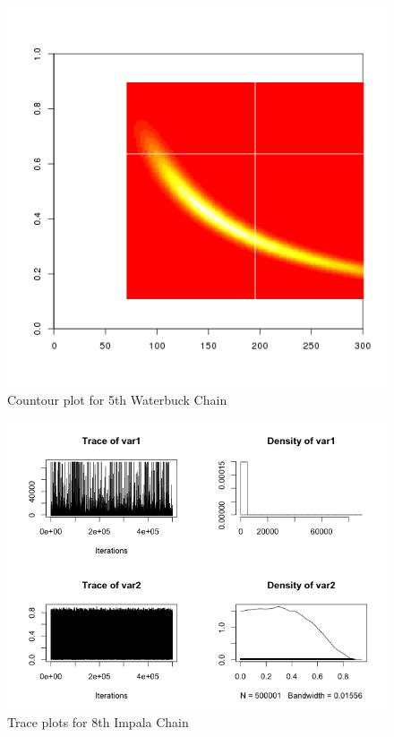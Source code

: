 \documentclass[paper=a4, fontsize=11pt]{scrartcl}
\begin{document}
\begin{figure}[h!]
  \caption{Countour plot for 5th Waterbuck Chain}
  \centering
	\includegraphics[scale=.8]{keskici_wxiao_ps4_task_waterbuck_run5_plot5.png}
\end{figure}

\begin{figure}[h!]
  \caption{Trace plots for 8th Impala Chain}
  \centering
	\includegraphics[scale=.8]{Rplot_job8a.png}
\end{figure}
\end{document}
